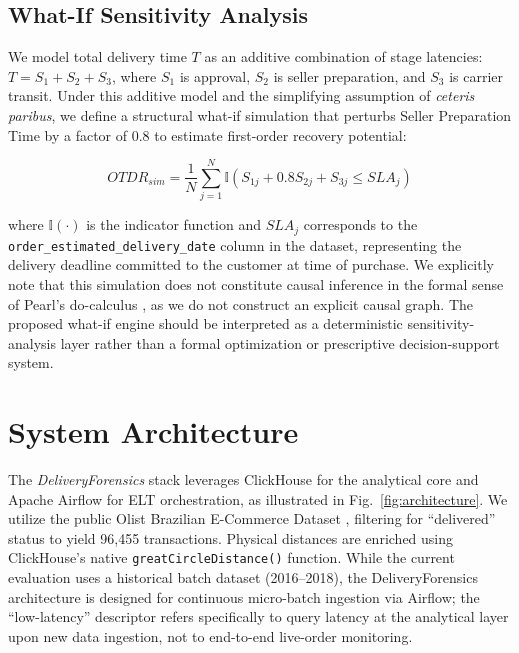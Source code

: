 \documentclass[conference]{IEEEtran}
\begin{document}
\subsection{What-If Sensitivity Analysis}
We model total delivery time $T$ as an additive combination of stage latencies: $T = S_1 + S_2 + S_3$, where $S_1$ is approval, $S_2$ is seller preparation, and $S_3$ is carrier transit. Under this additive model and the simplifying assumption of \textit{ceteris paribus}, we define a structural what-if simulation that perturbs Seller Preparation Time by a factor of 0.8 to estimate first-order recovery potential:

\begin{equation}
OTDR_{sim} = \frac{1}{N} \sum_{j=1}^{N} \mathbb{I} \left( S_{1j} + 0.8 S_{2j} + S_{3j} \leq SLA_j \right)
\end{equation}

where $\mathbb{I}(\cdot)$ is the indicator function and $SLA_j$ corresponds to the \texttt{order\_estimated\_delivery\_date} column in the dataset, representing the delivery deadline committed to the customer at time of purchase. We explicitly note that this simulation does not constitute causal inference in the formal sense of Pearl's do-calculus \cite{pearl2009causality}, as we do not construct an explicit causal graph. The proposed what-if engine should be interpreted as a deterministic sensitivity-analysis layer rather than a formal optimization or prescriptive decision-support system.

\section{System Architecture}

The \textit{DeliveryForensics} stack leverages ClickHouse for the analytical core and Apache Airflow for ELT orchestration, as illustrated in Fig.~\ref{fig:architecture}. We utilize the public Olist Brazilian E-Commerce Dataset \cite{olist2018}, filtering for ``delivered'' status to yield 96,455 transactions. Physical distances are enriched using ClickHouse's native \texttt{greatCircleDistance()} function. While the current evaluation uses a historical batch dataset (2016--2018), the DeliveryForensics architecture is designed for continuous micro-batch ingestion via Airflow; the ``low-latency'' descriptor refers specifically to query latency at the analytical layer upon new data ingestion, not to end-to-end live-order monitoring.
\end{document}
